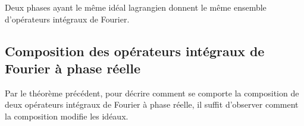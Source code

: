 \begin{corr}
	Deux phases ayant le même idéal lagrangien donnent le même ensemble d'opérateurs intégraux de Fourier.
\end{corr}

\subsection{Composition des opérateurs intégraux de Fourier à phase réelle}
Par le théorème précédent, pour décrire comment se comporte la composition de deux opérateurs intégraux de Fourier à phase réelle, il suffit d'observer comment la composition modifie les idéaux.

\chantier